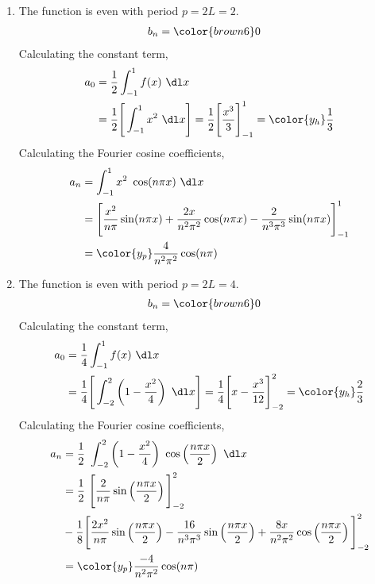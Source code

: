 \begin{enumerate}
    \item The function is even with period $ p = 2L = 2 $.
          \begin{align}
              b_n & = \color{brown6} 0
          \end{align}
          Calculating the constant term,
          \begin{align}
              a_0 & = \frac{1}{2} \int_{-1}^{1} f(x)\ \dl x              \\
                  & = \frac{1}{2} \Bigg[ \int_{-1}^{1} x^2\ \dl x \Bigg]
              = \frac{1}{2} \Bigg[\frac{x^3}{3}\Bigg]_{-1}^{1}
              = \color{y_h} \frac{1}{3}
          \end{align}
          Calculating the Fourier cosine coefficients,
          \begin{align}
              a_n & = \int_{-1}^{1} x^2\ \cos (n\pi x)\ \dl x                    \\
                  & = \Bigg[\frac{x^2}{n\pi} \sin(n\pi x) + \frac{2x}{n^2 \pi^2}
              \cos(n\pi x) - \frac{2}{n^3 \pi^3} \sin(n\pi x)\Bigg]_{-1}^{1}     \\
                  & = \color{y_p} \frac{4}{n^2 \pi^2} \cos(n\pi)
          \end{align}

    \item The function is even with period $ p = 2L = 4 $.
          \begin{align}
              b_n & = \color{brown6} 0
          \end{align}
          Calculating the constant term,
          \begin{align}
              a_0 & = \frac{1}{4} \int_{-1}^{1} f(x)\ \dl x                     \\
                  & = \frac{1}{4} \Bigg[ \int_{-2}^{2} \left( 1 - \frac{x^2}{4}
                  \right)\ \dl x \Bigg]
              = \frac{1}{4} \Bigg[x - \frac{x^3}{12}\Bigg]_{-2}^{2}
              = \color{y_h} \frac{2}{3}
          \end{align}
          Calculating the Fourier cosine coefficients,
          \begin{align}
              a_n & = \frac{1}{2}\ \int_{-2}^{2} \left( 1 - \frac{x^2}{4} \right)
              \ \cos \left( \frac{n\pi x}{2} \right)\ \dl x                            \\
                  & = \frac{1}{2}\ \Bigg[ \frac{2}{n\pi} \sin\left( \frac{n\pi x}{2}
              \right) \Bigg]_{-2}^{2}                                                  \\
                  & - \frac{1}{8} \Bigg[ \frac{2x^2}{n\pi} \sin\left( \frac{n\pi x}{2}
                  \right) - \frac{16}{n^3\pi^3} \sin\left( \frac{n\pi x}{2} \right)
                  + \frac{8x}{n^2 \pi^2} \cos\left( \frac{n\pi x}{2} \right)
              \Bigg]_{-2}^{2}                                                          \\
                  & = \color{y_p} \frac{-4}{n^2 \pi^2} \cos(n\pi)
          \end{align}


\end{enumerate}
